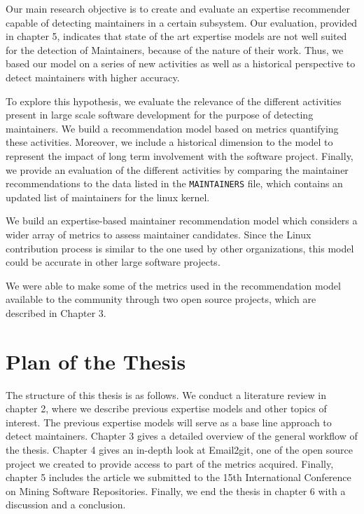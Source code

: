 Our main research objective is to create and evaluate an expertise recommender capable of detecting maintainers in a certain subsystem. Our evaluation, provided in chapter 5, indicates that state of the art expertise models are not well suited for the detection of Maintainers, because of the nature of their work. Thus, we based our model on a series of new activities as well as a historical perspective to detect maintainers with higher accuracy.




To explore this hypothesis, we evaluate the relevance of the different activities present in large scale software development for the purpose of detecting maintainers. We build a recommendation model based on metrics quantifying these activities. Moreover, we include a historical dimension to the model to represent the impact of long term involvement with the software project. Finally, we provide an evaluation of the different activities by comparing the maintainer recommendations to the data listed in the \texttt{MAINTAINERS} file, which contains an updated list of maintainers for the linux kernel.

We build an expertise-based maintainer recommendation model which considers a wider array of metrics to assess maintainer candidates. Since the Linux contribution process is similar to the one used by other organizations, this model could be accurate in other large software projects. 

We were able to make some of the metrics used in the recommendation model available to the community through two open source projects, which are described in Chapter 3.



\section{Plan of the Thesis}


The structure of this thesis is as follows. We conduct a literature review in chapter 2, where we describe previous expertise models and other topics of interest. The previous expertise models will serve as a base line approach to detect maintainers. Chapter 3 gives a detailed overview of the general workflow of the thesis. Chapter 4 gives an in-depth look at Email2git, one of the open source project we created to provide access to part of the metrics acquired. Finally, chapter 5 includes the article we submitted to the 15th International Conference on Mining Software Repositories. Finally, we end the thesis in chapter 6 with a discussion and a conclusion. 



